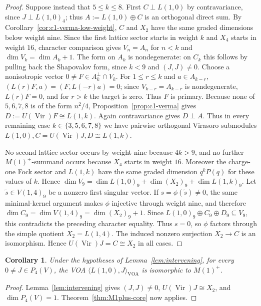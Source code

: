 \documentclass[12pt,leqno]{amsart}
\numberwithin{equation}{section} \newtheorem{thm}{Theorem}[section] \newtheorem{lem}[thm]{Lemma} \newtheorem{ex}[thm]{Example} \newtheorem{prop}[thm]{Proposition} \newtheorem{cor}[thm]{Corollary} \newtheorem{defi}[thm]{Definition} \newtheorem{rmk}[thm]{Remark} \newtheorem{notation}[thm]{Notation}
\newcommand{\Vir}{\operatorname{Vir}}
\begin{document}
\begin{proof}
Suppose instead that $5\le k\le8$. First $C\perp L(1,0)$ by contravariance, since $J\perp L(1,0)_4$; thus $A:=L(1,0)\oplus C$ is an orthogonal direct sum. By Corollary~\ref{cor:c1-verma-low-weight}, $C$ and $X_2$ have the same graded dimensions below weight nine. Since the first lattice sector starts in weight $k$ and $X_4$ starts in weight $16$, character comparison gives $V_n=A_n$ for $n<k$ and $\dim V_k=\dim A_k+1$. The form on $A_k$ is nondegenerate: on $C_k$ this follows by pulling back the Shapovalov form, since $k<9$ and $(J,J)\ne0$. Choose a nonisotropic vector $0\ne F\in A_k^\perp\cap V_k$. For $1\le r\le k$ and $a\in A_{k-r}$, \((L(r)F,a)=(F,L(-r)a)=0\); since $V_{k-r}=A_{k-r}$ is nondegenerate, $L(r)F=0$, and for $r>k$ the target is zero. Thus $F$ is primary. Because none of $5,6,7,8$ is of the form $n^2/4$, Proposition~\ref{prop:c1-verma} gives \(D:=U(\Vir)F\cong L(1,k)\). Again contravariance gives $D\perp A$. Thus in every remaining case $k\in\{3,5,6,7,8\}$ we have pairwise orthogonal Virasoro submodules \(L(1,0), C=U(\Vir)J, D\cong L(1,k).\)

No second lattice sector occurs by weight nine because $4k>9$, and no further $M(1)^+$-summand occurs because $X_4$ starts in weight $16$. Moreover the charge-one Fock sector and $L(1,k)$ have the same graded dimension $q^kP(q)$ for these values of $k$. Hence \(\dim V_9=\dim L(1,0)_9+\dim(X_2)_9+\dim L(1,k)_9.\) Let $\widetilde s\in V(1,4)_9$ be a nonzero first singular vector. If $s=\phi(\widetilde s)\ne0$, the same minimal-kernel argument makes $\phi$ injective through weight nine, and therefore \(\dim C_9=\dim V(1,4)_9=\dim(X_2)_9+1\). Since $L(1,0)_9\oplus C_9\oplus D_9\subseteq V_9$, this contradicts the preceding character equality. Thus $s=0$, so $\phi$ factors through the simple quotient $X_2=L(1,4)$. The induced nonzero surjection $X_2\to C$ is an isomorphism. Hence \(U(\Vir)J=C\cong X_2\) in all cases.
\end{proof}

\begin{cor}\label{cor:M1plus-kgt4}
Under the hypotheses of Lemma~\ref{lem:intervening}, for every \(0\ne J\in P_4(V)\), the VOA \(\langle L(1,0),J\rangle_{\mathrm{VOA}}\) is isomorphic to \(M(1)^+\).
\end{cor}

\begin{proof}
Lemma~\ref{lem:intervening} gives \((J,J)\ne0\), \(U(\Vir)J\cong X_2\), and \(\dim P_4(V)=1\). Theorem~\ref{thm:M1plus-core} now applies.
\end{proof}
\end{document}
